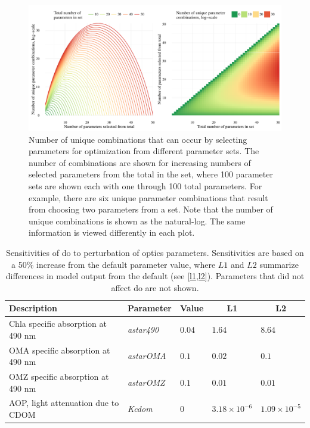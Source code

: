 \documentclass[letterpaper,12pt,oneside]{article}\usepackage[]{graphicx}\usepackage[]{color}
\begin{document}
\begin{figure}[!ht]

{\centering \includegraphics[width=\textwidth]{figs/combnex-1} 

}

\caption[Number of unique combinations that can occur by selecting parameters for optimization from different parameter sets]{Number of unique combinations that can occur by selecting parameters for optimization from different parameter sets.  The number of combinations are shown for increasing numbers of selected parameters from the total in the set, where 100 parameter sets are shown each with one through 100 total parameters.  For example, there are six unique parameter combinations that result from choosing two parameters from a set.  Note that the number of unique combinations is shown as the natural-log.  The same information is viewed differently in each plot.}\label{fig:combnex}
\end{figure}



\clearpage

\begin{table}[!tbp]
{\normalsize
\caption{Sensitivities of \ac{do} to perturbation of optics parameters.  Sensitivities are based on a 50\% increase from the default parameter value, where $L1$ and $L2$ summarize differences in model output from the default (see \cref{l1,l2}).  Parameters that did not affect \ac{do} are not shown.\label{tab:optsens}} 
\begin{center}
\begin{tabular}{lllll}
\hline\hline
\multicolumn{1}{l}{Description}&\multicolumn{1}{c}{Parameter}&\multicolumn{1}{c}{Value}&\multicolumn{1}{c}{L1}&\multicolumn{1}{c}{L2}\tabularnewline
\hline
Chla specific absorption at 490 nm&\textit{astar490}&$0.04$&$1.64$&$8.64$\tabularnewline
OMA specific absorption at 490 nm&\textit{astarOMA}&$0.1$&$0.02$&$0.1$\tabularnewline
OMZ specific absorption at 490 nm&\textit{astarOMZ}&$0.1$&$0.01$&$0.01$\tabularnewline
AOP, light attenuation due to CDOM&\textit{Kcdom}&$0$&$3.18\times 10^{-6}$&$1.09\times 10^{-5}$\tabularnewline
\hline
\end{tabular}\end{center}}

\end{table}
\end{document}
